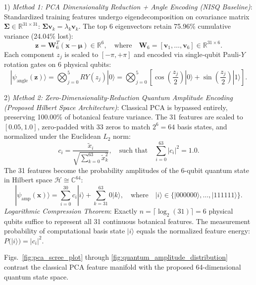 \documentclass{ieeeaccess}
\begin{document}
1) \textit{Method 1: PCA Dimensionality Reduction + Angle Encoding (NISQ Baseline)}: Standardized training features undergo eigendecomposition on covariance matrix $\boldsymbol{\Sigma} \in \mathbb{R}^{31 \times 31}$: $\boldsymbol{\Sigma} \mathbf{v}_k = \lambda_k \mathbf{v}_k$. The top 6 eigenvectors retain 75.96\% cumulative variance (24.04\% lost):
\begin{equation}
\mathbf{z} = \mathbf{W}_6^T (\mathbf{x} - \boldsymbol{\mu}) \in \mathbb{R}^6, \quad \text{where} \quad \mathbf{W}_6 = [\mathbf{v}_1, \dots, \mathbf{v}_6] \in \mathbb{R}^{31 \times 6}.
\label{eq:pca_projection}
\end{equation}
Each component $z_j$ is scaled to $[-\pi, +\pi]$ and encoded via single-qubit Pauli-$Y$ rotation gates on 6 physical qubits:
\begin{equation}
|\psi_{\text{angle}}(\mathbf{z})\rangle = \bigotimes_{j=0}^5 RY(z_j)|0\rangle = \bigotimes_{j=0}^5 \left[ \cos\left(\frac{z_j}{2}\right)|0\rangle + \sin\left(\frac{z_j}{2}\right)|1\rangle \right].
\label{eq:method1_angle}
\end{equation}

2) \textit{Method 2: Zero-Dimensionality-Reduction Quantum Amplitude Encoding (Proposed Hilbert Space Architecture)}: Classical PCA is bypassed entirely, preserving 100.00\% of botanical feature variance. The 31 features are scaled to $[0.05, 1.0]$, zero-padded with 33 zeros to match $2^6 = 64$ basis states, and normalized under the Euclidean $L_2$ norm:
\begin{equation}
c_i = \frac{\tilde{x}_i}{\sqrt{\sum_{k=0}^{63} \tilde{x}_k^2}}, \quad \text{such that} \quad \sum_{i=0}^{63} |c_i|^2 = 1.0.
\label{eq:normalization}
\end{equation}
The 31 features become the probability amplitudes of the 6-qubit quantum state in Hilbert space $\mathcal{H} \cong \mathbb{C}^{64}$:
\begin{equation}
|\psi_{\text{amp}}(\mathbf{x})\rangle = \sum_{i=0}^{30} c_i |i\rangle + \sum_{k=31}^{63} 0 |k\rangle, \quad \text{where} \quad |i\rangle \in \{|000000\rangle, \dots, |111111\rangle\}.
\label{eq:method2_amp}
\end{equation}
\textit{Logarithmic Compression Theorem}: Exactly $n = \lceil \log_2(31) \rceil = 6$ physical qubits suffice to represent all 31 continuous botanical features. The measurement probability of computational basis state $|i\rangle$ equals the normalized feature energy: $P(|i\rangle) = |c_i|^2$.

Figs.~\ref{fig:pca_scree_plot} through \ref{fig:quantum_amplitude_distribution} contrast the classical PCA feature manifold with the proposed 64-dimensional quantum state space.
\end{document}
